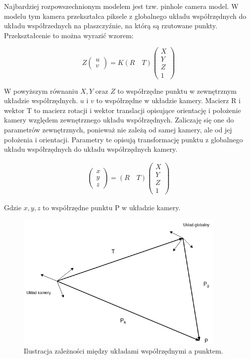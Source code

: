 \documentclass[oneside, eng]{mgr}
\begin{document}
Najbardziej rozpowszechnionym modelem jest tzw. pinhole camera model. W modelu tym kamera przekształca piksele z globalnego układu współrzędnych do układu współrzednych na płaszczyźnie, na którą są rzutowane punkty. Przekształcenie to można wyrazić wzorem:

\begin{equation}
	Z
	\left( \begin{array}{l}
		u \\
		v 
	\end{array} \right) 
	= K (R \quad T) 
	\left( \begin{array}{l}
		X \\	Y \\	Z \\	1
	\end{array} \right) 
\end{equation}

W powyższym równaniu $X, Y$ oraz $Z$ to współrzędne punktu w zewnętrznym układzie współrzędnych.
$u$ i $v$ to współrzędne w układzie kamery.
Macierz R i wektor T to macierz rotacji i wektor translacji opisujące orientację i położenie kamery względem zewnętrznego układu współrzędnych. Zaliczaję się one do parametrów zewnętrznych, ponieważ nie zależą od samej kamery, ale od jej położenia i orientacji. Parametry te opisują transformację punktu z globalnego układu współrzędnych do układu współrzędnych kamery. 

\begin{align*}
	\left( \begin{array}{l} x \\ y \\ z \end{array} \right) =
	(R \quad T)
	\left( \begin{array}{l}
		X \\	Y \\	Z \\	1
	\end{array} \right) 
\end{align*}

Gdzie $x, y, z$ to współrzędne punktu P w układzie kamery.


\begin{figure}
\centering
	\includegraphics[width=0.90\textwidth]{pinhole.jpg}\par\vspace{1cm}
\caption{Ilustracja zależności między układami współrzędnymi a punktem.}
	\label{fig:camera_coordinate_systems}
\end{figure}
\end{document}
